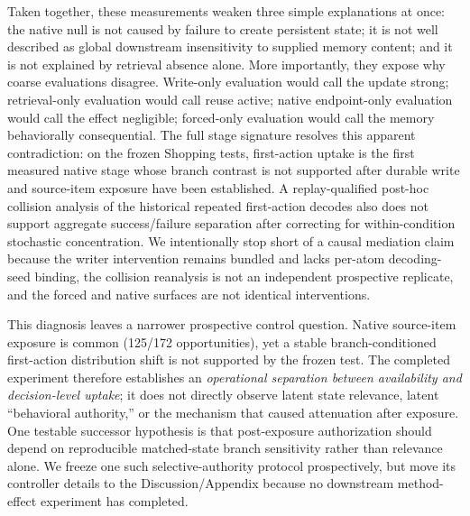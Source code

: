 Taken together, these measurements weaken three simple explanations at once: the native null is not caused by failure to create persistent state; it is not well described as global downstream insensitivity to supplied memory content; and it is not explained by retrieval absence alone. More importantly, they expose why coarse evaluations disagree. Write-only evaluation would call the update strong; retrieval-only evaluation would call reuse active; native endpoint-only evaluation would call the effect negligible; forced-only evaluation would call the memory behaviorally consequential. The full stage signature resolves this apparent contradiction: on the frozen Shopping tests, first-action uptake is the first measured native stage whose branch contrast is not supported after durable write and source-item exposure have been established. A replay-qualified post-hoc collision analysis of the historical repeated first-action decodes also does not support aggregate success/failure separation after correcting for within-condition stochastic concentration. We intentionally stop short of a causal mediation claim because the writer intervention remains bundled and lacks per-atom decoding-seed binding, the collision reanalysis is not an independent prospective replicate, and the forced and native surfaces are not identical interventions.

This diagnosis leaves a narrower prospective control question. Native source-item exposure is common (125/172 opportunities), yet a stable branch-conditioned first-action distribution shift is not supported by the frozen test. The completed experiment therefore establishes an \emph{operational separation between availability and decision-level uptake}; it does not directly observe latent state relevance, latent ``behavioral authority,'' or the mechanism that caused attenuation after exposure. One testable successor hypothesis is that post-exposure authorization should depend on reproducible matched-state branch sensitivity rather than relevance alone. We freeze one such selective-authority protocol prospectively, but move its controller details to the Discussion/Appendix because no downstream method-effect experiment has completed.


